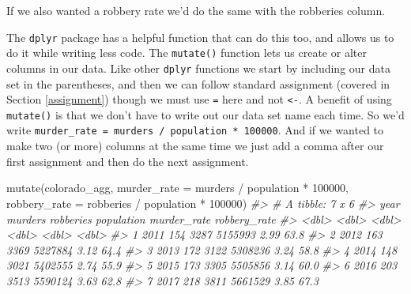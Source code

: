 \documentclass[
]{krantz}
\makeatletter
\newenvironment{Shaded}{\begin{snugshade}}{\end{snugshade}}
\newcommand{\AttributeTok}[1]{\textcolor[rgb]{0.61,0.61,0.61}{#1}}
\newcommand{\CommentTok}[1]{\textcolor[rgb]{0.37,0.37,0.37}{\textit{#1}}}
\newcommand{\DecValTok}[1]{\textcolor[rgb]{0.06,0.06,0.06}{#1}}
\newcommand{\FunctionTok}[1]{\textcolor[rgb]{0,0,0}{#1}}
\newcommand{\NormalTok}[1]{#1}
\newcommand{\OtherTok}[1]{\textcolor[rgb]{0.37,0.37,0.37}{#1}}
\newcommand{\SpecialCharTok}[1]{\textcolor[rgb]{0,0,0}{#1}}
\newenvironment{kframe}{%
\medskip{}
\setlength{\fboxsep}{.8em}
 \def\at@end@of@kframe{}%
 \ifinner\ifhmode%
  \def\at@end@of@kframe{\end{minipage}}%
  \begin{minipage}{\columnwidth}%
 \fi\fi%
 \def\FrameCommand##1{\hskip\@totalleftmargin \hskip-\fboxsep
 \colorbox{shadecolor}{##1}\hskip-\fboxsep
     \hskip-\linewidth \hskip-\@totalleftmargin \hskip\columnwidth}%
 \MakeFramed {\advance\hsize-\width
   \@totalleftmargin\z@ \linewidth\hsize
   \@setminipage}}%
 {\par\unskip\endMakeFramed%
 \at@end@of@kframe}
\renewenvironment{Shaded}{\begin{kframe}}{\end{kframe}}
\makeatother
\begin{document}
If we also wanted a robbery rate we'd do the same with the robberies column.

\begin{Shaded}
\end{Shaded}

The \texttt{dplyr} package has a helpful function that can do this too, and allows us to do it while writing less code. The \texttt{mutate()} function lets us create or alter columns in our data. Like other \texttt{dplyr} functions we start by including our data set in the parentheses, and then we can follow standard assignment (covered in Section \ref{assignment}) though we must use \texttt{=} here and not \texttt{\textless{}-}. A benefit of using \texttt{mutate()} is that we don't have to write out our data set name each time. So we'd write \texttt{murder\_rate\ =\ murders\ /\ population\ *\ 100000}. And if we wanted to make two (or more) columns at the same time we just add a comma after our first assignment and then do the next assignment.

\begin{Shaded}
\begin{Highlighting}[]
\FunctionTok{mutate}\NormalTok{(colorado\_agg,}
       \AttributeTok{murder\_rate  =}\NormalTok{ murders }\SpecialCharTok{/}\NormalTok{ population }\SpecialCharTok{*} \DecValTok{100000}\NormalTok{,}
       \AttributeTok{robbery\_rate =}\NormalTok{ robberies }\SpecialCharTok{/}\NormalTok{ population }\SpecialCharTok{*} \DecValTok{100000}\NormalTok{)}
\CommentTok{\#\textgreater{} \# A tibble: 7 x 6}
\CommentTok{\#\textgreater{}    year murders robberies population murder\_rate robbery\_rate}
\CommentTok{\#\textgreater{}   \textless{}dbl\textgreater{}   \textless{}dbl\textgreater{}     \textless{}dbl\textgreater{}      \textless{}dbl\textgreater{}       \textless{}dbl\textgreater{}        \textless{}dbl\textgreater{}}
\CommentTok{\#\textgreater{} 1  2011     154      3287    5155993        2.99         63.8}
\CommentTok{\#\textgreater{} 2  2012     163      3369    5227884        3.12         64.4}
\CommentTok{\#\textgreater{} 3  2013     172      3122    5308236        3.24         58.8}
\CommentTok{\#\textgreater{} 4  2014     148      3021    5402555        2.74         55.9}
\CommentTok{\#\textgreater{} 5  2015     173      3305    5505856        3.14         60.0}
\CommentTok{\#\textgreater{} 6  2016     203      3513    5590124        3.63         62.8}
\CommentTok{\#\textgreater{} 7  2017     218      3811    5661529        3.85         67.3}
\end{Highlighting}
\end{Shaded}
\end{document}
